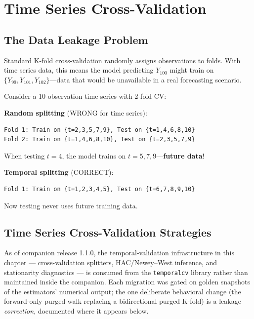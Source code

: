 \section{Time Series Cross-Validation}\label{sec:ts_cross_validation}

\subsection{The Data Leakage Problem}

Standard K-fold cross-validation randomly assigns observations to folds. With time series data, this means the model predicting $Y_{100}$ might train on $\{Y_{99}, Y_{101}, Y_{102}\}$---data that would be unavailable in a real forecasting scenario.

\begin{example}
\label{ex:data_leakage}
Consider a 10-observation time series with 2-fold CV:

\textbf{Random splitting} (WRONG for time series):
\begin{verbatim}
Fold 1: Train on {t=2,3,5,7,9}, Test on {t=1,4,6,8,10}
Fold 2: Train on {t=1,4,6,8,10}, Test on {t=2,3,5,7,9}
\end{verbatim}

When testing $t=4$, the model trains on $t=5,7,9$---\textbf{future data}!

\textbf{Temporal splitting} (CORRECT):
\begin{verbatim}
Fold 1: Train on {t=1,2,3,4,5}, Test on {t=6,7,8,9,10}
\end{verbatim}

Now testing never uses future training data.
\end{example}

\subsection{Time Series Cross-Validation Strategies}

\begin{remark}[Companion v1.1.0]
As of companion release 1.1.0, the temporal-validation infrastructure in
this chapter --- cross-validation splitters, HAC/Newey--West inference, and
stationarity diagnostics --- is consumed from the \texttt{temporalcv}
library rather than maintained inside the companion. Each migration was
gated on golden snapshots of the estimators' numerical output; the one
deliberate behavioral change (the forward-only purged walk replacing a
bidirectional purged K-fold) is a leakage \emph{correction}, documented
where it appears below.
\end{remark}

